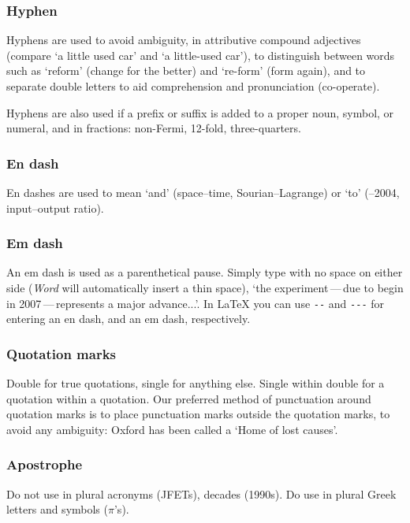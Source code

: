 \documentclass[12pt,twoside,a4paper]{cernrep}
\begin{document}
\subsubsection{Hyphen}

Hyphens are used to avoid ambiguity, \ie in attributive compound
adjectives (compare `a little used car' and `a little-used car'), to
distinguish between words such as `reform' (change for the better) and
`re-form' (form again), and to separate double letters to aid
comprehension and pronunciation (\eg co-operate).

Hyphens are also used if a prefix or suffix is added to a proper noun,
symbol, or numeral, and in fractions: \eg non-Fermi, 12-fold,
three-quarters.

\subsubsection{En dash}

En dashes are used to mean `and' (\eg space--time, Sourian--Lagrange)
or `to' (--2004, input--output ratio).

\subsubsection{Em dash}

An em dash is used as a parenthetical pause. Simply type with no space
on either side (\emph{Word} will automatically insert a thin space),
\eg `the experiment\,---\,due to begin in 2007\,---\,represents a
major advance...'. In \LaTeX{} you can use \texttt{{-}{-}} and
\texttt{{-}{-}{-}} for entering an en dash, and an em dash,
respectively.

\subsubsection{Quotation marks}

Double for true quotations, single for anything else. Single within
double for a quotation within a quotation. Our preferred method of
punctuation around quotation marks is to place punctuation marks
outside the quotation marks, to avoid any ambiguity: Oxford has been
called a `Home of lost causes'.


\subsubsection{Apostrophe}

Do not use in plural acronyms (\eg JFETs), decades (1990s).  Do use
in plural Greek letters and symbols (\eg $\pi$'s).
\end{document}
